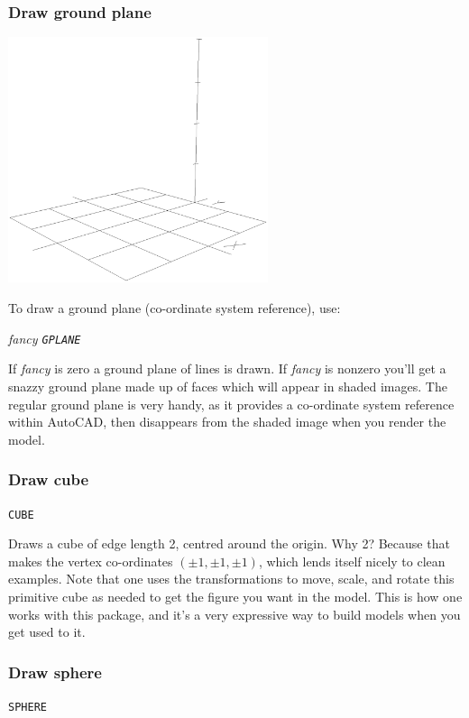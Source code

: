 \documentclass{article}
\begin{document}
\subsubsection{Draw ground plane}

\centerline{\includegraphics[width=3in]{cwfig1.eps}}

To draw a ground plane (co-ordinate system reference), use:

{\em fancy {\tt GPLANE}}

If {\em fancy} is zero a ground plane of lines is drawn.
If {\em fancy} is nonzero you'll get a snazzy ground plane made up of
faces which will appear in shaded images.  The regular ground plane is
very handy, as it provides a co-ordinate system reference within
AutoCAD, then disappears from the shaded image when you render the
model.

\subsubsection{Draw cube}

{\tt CUBE}

Draws a cube of edge length 2, centred around the origin.  Why 2?
Because that makes the vertex co-ordinates $(\pm 1, \pm 1, \pm 1)$,
which lends itself nicely to clean examples.  Note that one uses the
transformations to move, scale, and rotate this primitive cube as
needed to get the figure you want in the model.  This is how one works
with this package, and it's a very expressive way to build models when
you get used to it.

\subsubsection{Draw sphere}

{\tt SPHERE}
\end{document}
